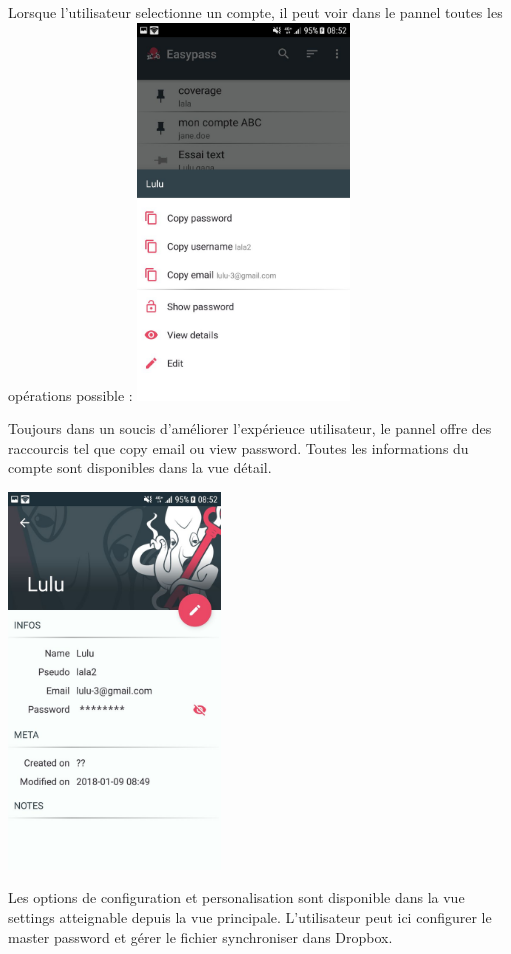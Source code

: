 Lorsque l'utilisateur selectionne un compte, il peut voir dans le pannel toutes les opérations possible : 
\includegraphics[height=10cm]{liste-edition.jpg}

Toujours dans un soucis d'améliorer l'expérieuce utilisateur, le pannel offre des raccourcis tel que copy email ou view password. Toutes les informations du compte sont disponibles dans la vue détail.

\includegraphics[height=10cm]{details.jpg}

Les options de configuration et personalisation sont disponible dans la vue settings atteignable depuis la vue principale. L'utilisateur peut ici configurer le master password et gérer le fichier synchroniser dans Dropbox.

